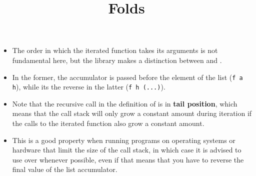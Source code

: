 \documentclass[wide]{slides}
\begin{document}
\begin{slide}
  \title{Folds}

  \begin{itemize}

    \item The order in which the iterated function takes its arguments
      is not fundamental here, but the \OCaml library makes a
      distinction between  and
      .

    \item In the former, the accumulator is passed before the element
      of the list (\texttt{f a h}), while its the reverse in the
      latter (\texttt{f h (...)}).

    \item Note that the recursive call in the definition of
       is in \textbf{tail position}, which means that
      the call stack will only grow a constant amount during iteration
      if the calls to the iterated function also grow a constant
      amount.

    \item This is a good property when running programs on operating
      systems or hardware that limit the size of the call stack, in
      which case it is advised to use  over
       whenever possible, even if that means
      that you have to reverse the final value of the list
      accumulator.

  \end{itemize}

\end{slide}
\end{document}
